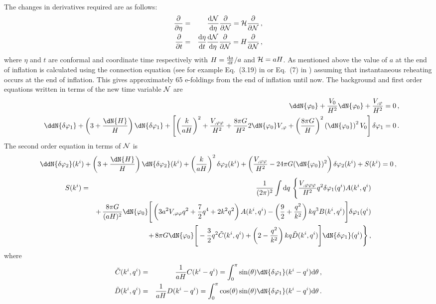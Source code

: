 The changes in derivatives required are as follows:
%
\begin{eqnarray}
 \frac{\partial  }{\partial \eta} &=& \frac{\mathrm{d} \mathcal{N}}{\mathrm{d} \eta}\frac{\partial }{\partial \mathcal{N}} = \mathcal{H} \frac{\partial }{\partial \mathcal{N}} \,,\\
 \frac{\partial  }{\partial t} &=& \frac{\mathrm{d} \eta}{\mathrm{d} t} \frac{\mathrm{d} \mathcal{N}}{\mathrm{d} \eta}\frac{\partial }{\partial \mathcal{N}} = H
\frac{\partial }{\partial \mathcal{N}}\,,
\end{eqnarray}
%
where $\eta$ and $t$ are conformal and coordinate time respectively with $H =
\frac{\mathrm{d} a}{\mathrm{d} t}/a$ and $\mathcal{H} = aH$.
As mentioned above the value
of $a$ at the end of inflation is calculated using the connection equation (see for example
Eq.~(3.19) in  or Eq.~(7) in ) assuming that instantaneous
reheating occurs
at the end of
inflation. This gives approximately 65 e-foldings from the end of inflation until now. 
% 
The background and first order equations written in terms of the new time
variable $\mathcal{N}$ are
%
\begin{eqnarray}
&&\ddN{\vp_{0}} + \frac{\U}{H^2}\dN{\vp_{0}} + \frac{\Uphi}{H^2} = 0 \,,
\label{eq:bgntime}\\
&&\ddN{\dvp1} + \left(3 + \frac{\dN{H}}{H}\right)\dN{\dvp1} +
\left[\left(\frac{k}{aH}\right)^2 + \frac{\Upp}{H^2} + \frac{8\pi G}{H^2}
2\dN{\vp_{0}}\Uphi + \left(\frac{8\pi G}{H}\right)^2
\left(\dN{\vp_{0}}\right)^2\U \right]\dvp1 = 0\,. \label{eq:fontime}
\end{eqnarray}
% 
The second order equation in terms of $\mathcal{N}$ is
% 
\begin{equation}
 \label{eq:KG2-fourier-sr-ntime}
\ddN{\dvp2}(\kvi)+\left(3 + \frac{\dN{H}}{H}\right)
\dN{\dvp2}(\kvi)+ \left(\frac{k}{aH}\right)^2\dvp2(\kvi)
+\left(\frac{\Upp}{H^2}-{24 \pi G}(\dN{\vp_{0}})^2\right)
\dvp2(\kvi) +S(\kvi) = 0 \,,
\end{equation}
% 
\begin{eqnarray}
\label{eq:KG2-source-ntime}
S(\kvi) &=& \frac{1}{(2\pi)^2}\int \d q\ \Bigg\{
\frac{\Uppp}{H^2} q^2 \dvp1(\qvi) A(\kvi,\qvi) \nonumber\\
&&+\, \frac{8\pi G}{(aH)^2}\dN{\vp_{0}} \Bigg[ 
\left( 3a^2\Upp q^2 + \frac{7}{2}q^4 + 2k^2q^2\right) A(\kvi,\qvi) %
-\left(\frac{9}{2} + \frac{q^2}{k^2}\right)kq^3 B(\kvi,\qvi)
\Bigg]\dvp1(\qvi) \nonumber\\
%
&&+\, 8\pi G \dN{\vp_{0}} \Bigg[
-\frac{3}{2}q^2 \tilde{C}(\kvi,\qvi) + \left(2-\frac{q^2}{k^2}\right)kq
\tilde{D}(\kvi,\qvi) 
\Bigg]\dN{\dvp1}(\qvi) \Bigg\}\,,
%
\end{eqnarray}
%
where 
%
\begin{eqnarray}
 \tilde{C}(\kvi,\qvi) &=& \frac{1}{aH} C(\kvi-\qvi) = \int_0^\pi \sin(\theta)
\dN{\dvp1}(\kvi-\qvi) \d\theta \,,\nonumber \\
 \tilde{D}(\kvi,\qvi) &=& \frac{1}{aH} D(\kvi-\qvi) = \int_0^\pi \cos(\theta)
\sin(\theta) \dN{\dvp1}(\kvi-\qvi)
\d\theta \,.
\end{eqnarray}



